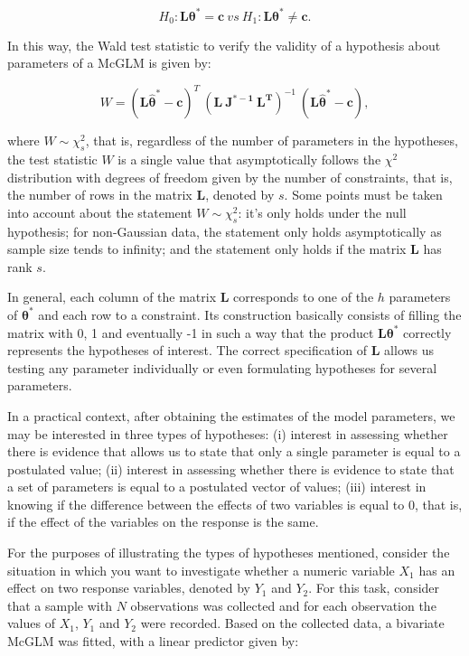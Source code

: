 \documentclass[USenglish]{article}
\theoremstyle{dgthm}
\theoremstyle{dgdef}
\begin{document}
\begin{equation}
\label{eq:hipoteses_wald}
H_0: \boldsymbol{L}\boldsymbol{\theta^{*}} = \boldsymbol{c} \ vs \ H_1: \boldsymbol{L}\boldsymbol{\theta^{*}} \neq \boldsymbol{c}. 
\end{equation}

\noindent In this way, the Wald test statistic to verify the validity of a hypothesis about parameters of a McGLM is given by:

$$
W = (\boldsymbol{L\hat\theta^{*}} - \boldsymbol{c})^T \ (\boldsymbol{L \ J^{\boldsymbol{*}-1} \ L^T})^{-1} \ (\boldsymbol{L\hat\theta^{*}} - \boldsymbol{c}),
$$

\noindent where $W \sim \chi^2_s$, that is, regardless of the number of parameters in the hypotheses, the test statistic $W$ is a single value that asymptotically follows the $\chi^2$ distribution with degrees of freedom given by the number of constraints, that is, the number of rows in the matrix $\boldsymbol{L}$, denoted by $s$. Some points must be taken into account about the statement $W \sim \chi^2_s$: it's only holds under the null hypothesis; for non-Gaussian data, the statement only holds asymptotically as sample size tends to infinity; and the statement only holds if the matrix $\boldsymbol{L}$ has rank $s$.

In general, each column of the matrix $\boldsymbol{L}$ corresponds to one of the $h$ parameters of $\boldsymbol{\theta^{*}}$ and each row to a constraint. Its construction basically consists of filling the matrix with 0, 1 and eventually -1 in such a way that the product $\boldsymbol{L}\boldsymbol{\theta^{*}}$ correctly represents the hypotheses of interest. The correct specification of $\boldsymbol{L}$ allows us testing any parameter individually or even formulating hypotheses for several parameters.

In a practical context, after obtaining the estimates of the model parameters, we may be interested in three types of hypotheses: (i) interest in assessing whether there is evidence that allows us to state that only a single parameter is equal to a postulated value; (ii) interest in assessing whether there is evidence to state that a set of parameters is equal to a postulated vector of values; (iii) interest in knowing if the difference between the effects of two variables is equal to 0, that is, if the effect of the variables on the response is the same.

For the purposes of illustrating the types of hypotheses mentioned, consider the situation in which you want to investigate whether a numeric variable $X_1$ has an effect on two response variables, denoted by $Y_1$ and $Y_2$. For this task, consider that a sample with $N$ observations was collected and for each observation the values of $X_1$, $Y_1$ and $Y_2$ were recorded. Based on the collected data, a bivariate McGLM was fitted, with a linear predictor given by:
\end{document}

